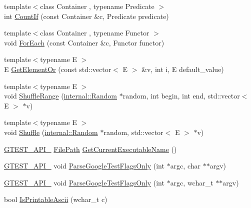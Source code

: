 \begin{DoxyCompactItemize}
\item 
{\footnotesize template$<$class Container , typename Predicate $>$ }\\int \hyperlink{namespacetesting_1_1internal_a1e77a774d910346eff11a86d8df783a5}{Count\+If} (const Container \&c, Predicate predicate)
\item 
{\footnotesize template$<$class Container , typename Functor $>$ }\\void \hyperlink{namespacetesting_1_1internal_a52f5504ed65d116201ccb8f99a44fd7e}{For\+Each} (const Container \&c, Functor functor)
\item 
{\footnotesize template$<$typename E $>$ }\\E \hyperlink{namespacetesting_1_1internal_a71fdd20a0686bea3dc0cdcd95e0bca1c}{Get\+Element\+Or} (const std\+::vector$<$ E $>$ \&v, int i, E default\+\_\+value)
\item 
{\footnotesize template$<$typename E $>$ }\\void \hyperlink{namespacetesting_1_1internal_a0e1d3dc36138a591769412d4c7779861}{Shuffle\+Range} (\hyperlink{classtesting_1_1internal_1_1_random}{internal\+::\+Random} $\ast$random, int begin, int end, std\+::vector$<$ E $>$ $\ast$v)
\item 
{\footnotesize template$<$typename E $>$ }\\void \hyperlink{namespacetesting_1_1internal_a90d9e6ffe8522a7eb1b2ce9b1a0c4673}{Shuffle} (\hyperlink{classtesting_1_1internal_1_1_random}{internal\+::\+Random} $\ast$random, std\+::vector$<$ E $>$ $\ast$v)
\item 
\hyperlink{gtest-port_8h_aa73be6f0ba4a7456180a94904ce17790}{G\+T\+E\+S\+T\+\_\+\+A\+P\+I\+\_\+} \hyperlink{classtesting_1_1internal_1_1_file_path}{File\+Path} \hyperlink{namespacetesting_1_1internal_a7a2bbf069f75bc99873976ad6fc356ad}{Get\+Current\+Executable\+Name} ()
\item 
\hyperlink{gtest-port_8h_aa73be6f0ba4a7456180a94904ce17790}{G\+T\+E\+S\+T\+\_\+\+A\+P\+I\+\_\+} void \hyperlink{namespacetesting_1_1internal_a472880afbcc592a41e3d623e2dec8412}{Parse\+Google\+Test\+Flags\+Only} (int $\ast$argc, char $\ast$$\ast$argv)
\item 
\hyperlink{gtest-port_8h_aa73be6f0ba4a7456180a94904ce17790}{G\+T\+E\+S\+T\+\_\+\+A\+P\+I\+\_\+} void \hyperlink{namespacetesting_1_1internal_aa3c81a67914856448d0778990d9d9cab}{Parse\+Google\+Test\+Flags\+Only} (int $\ast$argc, wchar\+\_\+t $\ast$$\ast$argv)
\item 
bool \hyperlink{namespacetesting_1_1internal_a744a6dd74c12d1e2c16b3c03e14ed4d4}{Is\+Printable\+Ascii} (wchar\+\_\+t c)

\end{DoxyCompactItemize}
